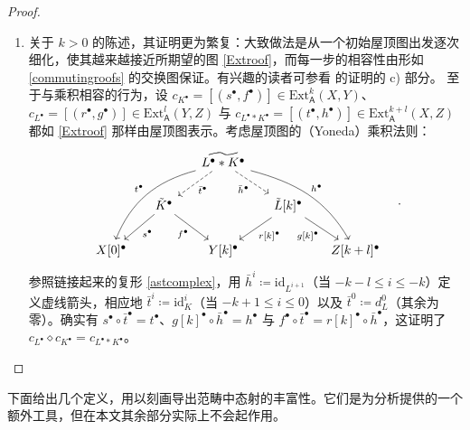 \begin{proof}
\begin{enumerate}[leftmargin=0.5cm]
		\item 关于 $k>0$ 的陈述，其证明更为繁复：大致做法是从一个初始屋顶图出发逐次细化，使其越来越接近所期望的图 \eqref{Extroof}，而每一步的相容性由形如 \eqref{commutingroofs} 的交换图保证。有兴趣的读者可参看 \cite[Theorem III.5.5]{[GM03]} 的证明的 c) 部分。 
		\newline 至于与乘积相容的行为，设 $c_{K^\bullet}=[(s^\bullet,f^\bullet)]\in\text{Ext}_\mathsf{A}^k(X,Y)$、$c_{L^\bullet}=[(r^\bullet,g^\bullet)]\in\text{Ext}_\mathsf{A}^l(Y,Z)$ 与 $c_{L^\bullet\ast K^\bullet}=[(t^\bullet,h^\bullet)]\in\text{Ext}_\mathsf{A}^{k+l}(X,Z)$ 都如 \eqref{Extroof} 那样由屋顶图表示。考虑屋顶图的（Yoneda）乘积法则：
		\[
		\begin{tikzcd}[column sep=0.5cm]
			& & \widetilde{L^\bullet\ast K^\bullet}\arrow[dl, dashed, "\bar{t}^\bullet"]\arrow[dr, dashed, "\bar{h}^\bullet"']\arrow[ddll, out=195, in=68,  "t^\bullet"']\arrow[ddrr, out=-15, in = 120, "h^\bullet"] & & \\
			& \tilde{K}^\bullet\arrow[dl, "s^\bullet"]\arrow[dr, "f^\bullet"'] & & \tilde{L}[k]^\bullet\arrow[dl, "{r[k]^\bullet}"]\arrow[dr, "{g[k]^\bullet}"'] & \\
			X[0]^\bullet & & Y[k]^\bullet & & Z[k+l]^\bullet
		\end{tikzcd}\quad.
		\]
		参照链接起来的复形 \eqref{astcomplex}，用 $\bar{h}^i\coloneqq\text{id}_{L^{i+1}}$（当 $-k-l\leq i\leq -k$）定义虚线箭头，相应地 $\bar{t}^i\coloneqq\text{id}_{K}^i$（当 $-k+1\leq i\leq 0$）以及 $\bar{t}^0\coloneqq d_L^0$（其余为零）。确实有 $s^\bullet\circ\bar{t}^\bullet=t^\bullet$、$g[k]^\bullet\circ\bar{h}^\bullet= h^\bullet$ 与 $f^\bullet\circ\bar{t}^\bullet=r[k]^\bullet\circ\bar{h}^\bullet$，这证明了 $c_{L^\bullet}\diamond c_{K^\bullet}=c_{L^\bullet\ast K^\bullet}$。   
	\end{enumerate}\vspace*{-0.5cm}
\end{proof}


下面给出几个定义，用以刻画导出范畴中态射的丰富性。它们是为分析提供的一个额外工具，但在本文其余部分实际上不会起作用。

